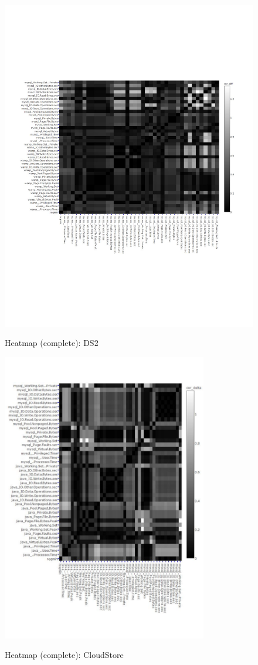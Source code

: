 \begin{figure}[tbh]
	\centering
	{\includegraphics[width=1.1\textwidth]{figures/appendix/ds2_heatmap_complete.pdf}}
	\caption{Heatmap (complete): DS2}
\end{figure}


\begin{figure}[tbh]
	\centering
	{\includegraphics[width=0.8\textwidth]{figures/appendix/cloudstore_heatmap_complete.pdf}}
	\caption{Heatmap (complete): CloudStore}
\end{figure}

